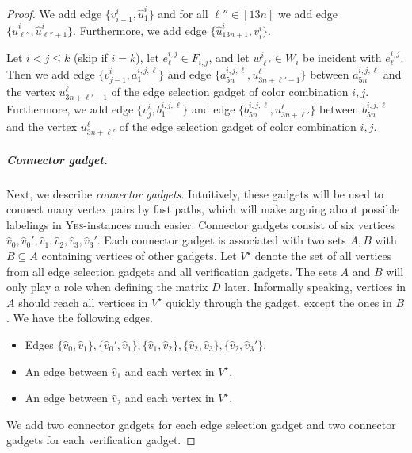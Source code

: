 \documentclass[a4paper,UKenglish,cleveref, autoref, thm-restate]{lipics-v2021}
\begin{document}
\begin{proof}
    We add edge $\{v^i_{i-1},\hat{u}^i_1\}$ and for all $\ell''\in[13n]$ we add edge $\{\hat{u}^i_{\ell''},\hat{u}^i_{\ell''+1}\}$. Furthermore, we add edge $\{\hat{u}^i_{13n+1},v^i_i\}$. 

    Let $i<j\le k$ (skip if $i=k$), let $e_\ell^{i,j}\in F_{i,j}$, and let $w^i_{\ell'}\in W_i$ be incident with $e_\ell^{i,j}$. Then we add edge $\{v_{j-1}^i,a^{i,j,\ell}_{1}\}$ and edge $\{a^{i,j,\ell}_{5n},u^\ell_{3n+\ell'-1}\}$ between $a^{i,j,\ell}_{5n}$ and the vertex $u^\ell_{3n+\ell'-1}$ of the edge selection gadget of color combination $i,j$.
    Furthermore, we add edge $\{v_{j}^i,b^{i,j,\ell}_{1}\}$ and edge $\{b^{i,j,\ell}_{5n},u^\ell_{3n+\ell'}\}$ between $b^{i,j,\ell}_{5n}$ and the vertex $u^\ell_{3n+\ell'}$ of the edge selection gadget of color combination $i,j$.


    \subparagraph{Connector gadget.} Next, we describe \emph{connector gadgets}. Intuitively, these gadgets will be used to connect many vertex pairs by fast paths, which will make arguing about possible labelings in \textsc{Yes}-instances much easier. Connector gadgets consist of six vertices $\hat{v}_0,\hat{v}_0',\hat{v}_1,\hat{v}_2,\hat{v}_3,\hat{v}_3'$. 
    Each connector gadget is associated with two sets $A,B$ with $B\subseteq A$ containing vertices of other gadgets. 
    Let $V^\star$ denote the set of all vertices from all edge selection gadgets and all verification gadgets.
    The sets $A$ and $B$ will only play a role when defining the matrix $D$ later. Informally speaking, vertices in $A$ should reach all vertices in $V^\star$ quickly through the gadget, except the ones in $B$.
    We have the following edges. 
    \begin{itemize}
        \item Edges $\{\hat{v}_0,\hat{v}_1\},\{\hat{v}_0',\hat{v}_1\},\{\hat{v}_1,\hat{v}_2\},\{\hat{v}_2,\hat{v}_3\},\{\hat{v}_2,\hat{v}_3'\}$.
        \item An edge between $\hat{v}_1$ and each vertex in $V^\star$.
        \item An edge between $\hat{v}_2$ and each vertex in $V^\star$.
    \end{itemize}
    We add two connector gadgets for each edge selection gadget and two connector gadgets for each verification gadget.
    

\end{proof}
\end{document}
